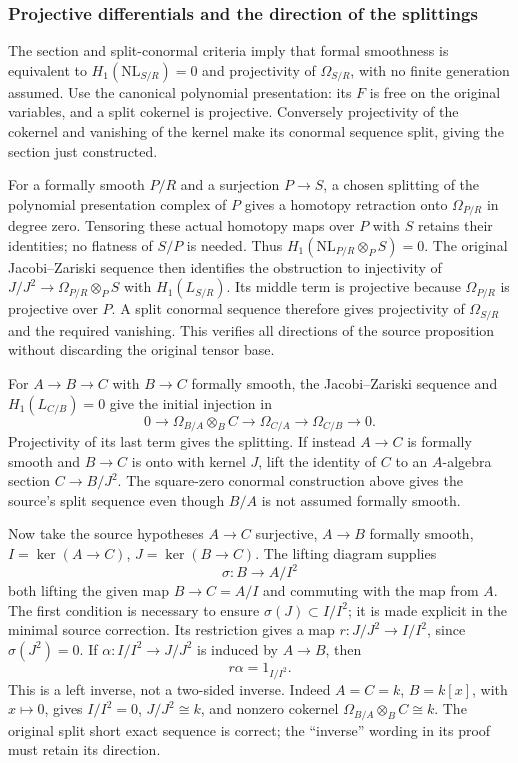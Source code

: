\subsubsection{Projective differentials and the direction of the splittings}\label{algebra-proof-048-projective-differentials-and-the-direction-of-the-splittings}

The section and split-conormal criteria imply that formal smoothness is equivalent to \(H_1(\mathrm{NL}_{S/R})=0\) and projectivity of \(\Omega_{S/R}\), with no finite generation assumed. Use the canonical polynomial presentation: its \(F\) is free on the original variables, and a split cokernel is projective. Conversely projectivity of the cokernel and vanishing of the kernel make its conormal sequence split, giving the section just constructed.

For a formally smooth \(P/R\) and a surjection \(P\to S\), a chosen splitting of the polynomial presentation complex of \(P\) gives a homotopy retraction onto \(\Omega_{P/R}\) in degree zero. Tensoring these actual homotopy maps over \(P\) with \(S\) retains their identities; no flatness of \(S/P\) is needed. Thus \(H_1(\mathrm{NL}_{P/R}\otimes_PS)=0\). The original Jacobi--Zariski sequence then identifies the obstruction to injectivity of \(J/J^2\to\Omega_{P/R}\otimes_PS\) with \(H_1(L_{S/R})\). Its middle term is projective because \(\Omega_{P/R}\) is projective over \(P\). A split conormal sequence therefore gives projectivity of \(\Omega_{S/R}\) and the required vanishing. This verifies all directions of the source proposition without discarding the original tensor base.

For \(A\to B\to C\) with \(B\to C\) formally smooth, the Jacobi--Zariski sequence and \(H_1(L_{C/B})=0\) give the initial injection in \[
0\longrightarrow\Omega_{B/A}\otimes_BC\longrightarrow
\Omega_{C/A}\longrightarrow\Omega_{C/B}\longrightarrow0.
\] Projectivity of its last term gives the splitting. If instead \(A\to C\) is formally smooth and \(B\to C\) is onto with kernel \(J\), lift the identity of \(C\) to an \(A\)-algebra section \(C\to B/J^2\). The square-zero conormal construction above gives the source's split sequence even though \(B/A\) is not assumed formally smooth.

Now take the source hypotheses \(A\to C\) surjective, \(A\to B\) formally smooth, \(I=\ker(A\to C)\), \(J=\ker(B\to C)\). The lifting diagram supplies \[
\sigma:B\longrightarrow A/I^2
\] both lifting the given map \(B\to C=A/I\) and commuting with the map from \(A\). The first condition is necessary to ensure \(\sigma(J)\subset I/I^2\); it is made explicit in the minimal source correction. Its restriction gives a map \(r:J/J^2\to I/I^2\), since \(\sigma(J^2)=0\). If \(\alpha:I/I^2\to J/J^2\) is induced by \(A\to B\), then \[
r\alpha=1_{I/I^2}.
\] This is a left inverse, not a two-sided inverse. Indeed \(A=C=k\), \(B=k[x]\), with \(x\mapsto0\), gives \(I/I^2=0\), \(J/J^2\cong k\), and nonzero cokernel \(\Omega_{B/A}\otimes_BC\cong k\). The original split short exact sequence is correct; the ``inverse'' wording in its proof must retain its direction.

